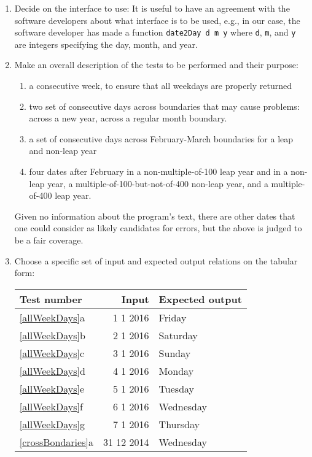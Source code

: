 \begin{enumerate}[label=]
\item Decide on the interface to use: It is useful to have an agreement with the software developers about what interface is to be used, e.g., in our case, the software developer has made a function \lstinline!date2Day d m y! where \lstinline!d!, \lstinline!m!, and \lstinline!y! are integers specifying the day, month, and year.
\item Make an overall description of the tests to be performed and their purpose:
  \begin{enumerate}[label=\arabic*]
  \item\label{allWeekDays} a consecutive week, to ensure that all weekdays are properly returned
  \item\label{crossBondaries} two set of consecutive days across boundaries that may cause problems: across a new year, across a regular month boundary.
  \item\label{februaryBoundaries} a set of consecutive days across February-March boundaries for a leap and non-leap year
  \item\label{leapYears} four dates after February in a non-multiple-of-100 leap year and in a non-leap year, a multiple-of-100-but-not-of-400 non-leap year, and a multiple-of-400 leap year.
  \end{enumerate}
  Given no information about the program's text, there are other dates that one could consider as likely candidates for errors, but the above is judged to be a fair coverage.
\item Choose a specific set of input and expected output relations on the tabular form:
\begin{center}
  \begin{tabular}{|l|r|l|}
    \hline
    \rowcolor{headerRowColor} Test number&Input& Expected output\\
    \hline
    \ref{allWeekDays}a&1 1 2016&Friday\\
    \ref{allWeekDays}b&2 1 2016&Saturday\\
    \ref{allWeekDays}c&3 1 2016&Sunday\\
    \ref{allWeekDays}d&4 1 2016&Monday\\
    \ref{allWeekDays}e&5 1 2016&Tuesday\\
    \ref{allWeekDays}f&6 1 2016&Wednesday\\
    \ref{allWeekDays}g&7 1 2016&Thursday\\
    \hline
    \ref{crossBondaries}a&31 12 2014&Wednesday\\

\end{tabular}
\end{center}
\end{enumerate}
